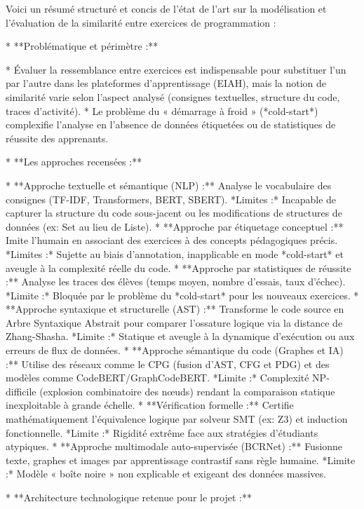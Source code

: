 Voici un résumé structuré et concis de l'état de l'art sur la modélisation et l'évaluation de la similarité entre exercices de programmation :

  * **Problématique et périmètre :**
    
      * Évaluer la ressemblance entre exercices est indispensable pour substituer l'un par l'autre dans les plateformes d'apprentissage (EIAH), mais la notion de similarité varie selon l'aspect analysé (consignes textuelles, structure du code, traces d'activité).
      * Le problème du « démarrage à froid » (*cold-start*) complexifie l'analyse en l'absence de données étiquetées ou de statistiques de réussite des apprenants.

  * **Les approches recensées :**
    
      * **Approche textuelle et sémantique (NLP) :** Analyse le vocabulaire des consignes (TF-IDF, Transformers, BERT, SBERT). *Limites :* Incapable de capturer la structure du code sous-jacent ou les modifications de structures de données (ex: Set au lieu de Liste).
      * **Approche par étiquetage conceptuel :** Imite l'humain en associant des exercices à des concepts pédagogiques précis. *Limites :* Sujette au biais d'annotation, inapplicable en mode *cold-start* et aveugle à la complexité réelle du code.
      * **Approche par statistiques de réussite :** Analyse les traces des élèves (temps moyen, nombre d'essais, taux d'échec). *Limite :* Bloquée par le problème du *cold-start* pour les nouveaux exercices.
      * **Approche syntaxique et structurelle (AST) :** Transforme le code source en Arbre Syntaxique Abstrait pour comparer l'ossature logique via la distance de Zhang-Shasha. *Limite :* Statique et aveugle à la dynamique d'exécution ou aux erreurs de flux de données.
      * **Approche sémantique du code (Graphes et IA) :** Utilise des réseaux comme le CPG (fusion d'AST, CFG et PDG) et des modèles comme CodeBERT/GraphCodeBERT. *Limite :* Complexité NP-difficile (explosion combinatoire des nœuds) rendant la comparaison statique inexploitable à grande échelle.
      * **Vérification formelle :** Certifie mathématiquement l'équivalence logique par solveur SMT (ex: Z3) et induction fonctionnelle. *Limite :* Rigidité extrême face aux stratégies d'étudiants atypiques.
      * **Approche multimodale auto-supervisée (BCRNet) :** Fusionne texte, graphes et images par apprentissage contrastif sans règle humaine. *Limite :* Modèle « boîte noire » non explicable et exigeant des données massives.

  * **Architecture technologique retenue pour le projet :**
    
